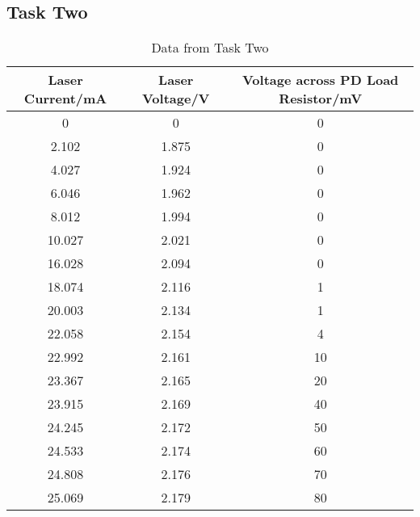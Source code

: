\documentclass[12pt]{article}
\begin{document}
    \subsection{Task Two}
    \begin{table}[H]
    \centering
    \caption{Data from Task Two}
    \begin{tabular}{c c c}
    \hline
    Laser Current/mA & Laser Voltage/V &  Voltage across PD Load Resistor/mV \\
    \hline
    0      & 0     & 0  \\
    2.102  & 1.875 & 0  \\
    4.027  & 1.924 & 0  \\
    6.046  & 1.962 & 0  \\
    8.012  & 1.994 & 0  \\
    10.027 & 2.021 & 0  \\
    16.028 & 2.094 & 0  \\
    18.074 & 2.116 & 1  \\
    20.003 & 2.134 & 1  \\
    22.058 & 2.154 & 4  \\
    22.992 & 2.161 & 10 \\
    23.367 & 2.165 & 20 \\
    23.915 & 2.169 & 40 \\
    24.245 & 2.172 & 50 \\
    24.533 & 2.174 & 60 \\
    24.808 & 2.176 & 70 \\
    25.069 & 2.179 & 80 \\
    \hline
    \end{tabular}
    \end{table}
    
\end{document}
